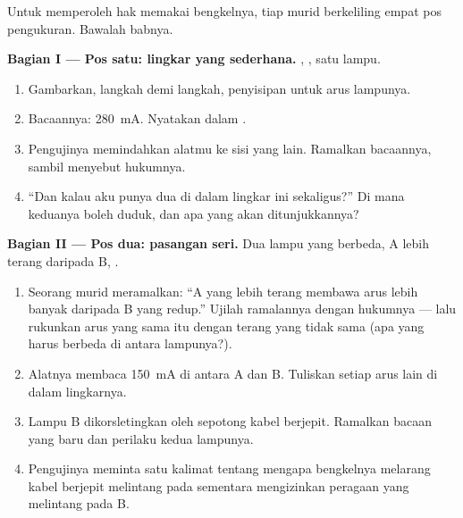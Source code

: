 \begin{problem}\label{pb:g8:intensity-ammeter:1}
Untuk memperoleh hak memakai bengkelnya, tiap murid berkeliling empat
pos pengukuran. Bawalah babnya.

\medskip\noindent\textbf{Bagian I --- Pos satu: lingkar yang
sederhana.}
, , satu lampu.
\begin{enumerate}
  \item Gambarkan, langkah demi langkah, penyisipan 
        untuk  arus lampunya.
  \item Bacaannya: \qty{280}{mA}. Nyatakan dalam .
  \item Pengujinya memindahkan alatmu ke sisi  yang lain.
        Ramalkan bacaannya, sambil menyebut hukumnya.
  \item ``Dan kalau aku punya dua  di dalam lingkar ini
        sekaligus?'' Di mana keduanya boleh duduk, dan apa yang akan
        ditunjukkannya?
\end{enumerate}

\medskip\noindent\textbf{Bagian II --- Pos dua: pasangan
seri.}
Dua lampu yang berbeda, A lebih terang daripada B, .
\begin{enumerate}[resume]
  \item Seorang murid meramalkan: ``A yang lebih terang membawa arus
        lebih banyak daripada B yang redup.'' Ujilah ramalannya dengan
        hukumnya --- lalu rukunkan arus yang sama itu dengan terang
        yang tidak sama (apa yang harus berbeda di antara lampunya?).
  \item Alatnya membaca \qty{150}{mA} di antara A dan B. Tuliskan
        setiap arus lain di dalam lingkarnya.
  \item Lampu B dikorsletingkan oleh sepotong kabel berjepit.
        Ramalkan bacaan yang baru dan perilaku kedua lampunya.
  \item Pengujinya meminta satu kalimat tentang mengapa bengkelnya
        melarang kabel berjepit melintang pada \emph{}
        sementara mengizinkan peragaan yang melintang pada B.
\end{enumerate}


\end{problem}
